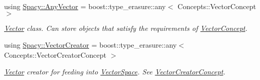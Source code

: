 \begin{DoxyCompactItemize}
using \hyperlink{group__SpacyGroup_gafc144d2730ef87a67e54f8cd750b1f54_gafc144d2730ef87a67e54f8cd750b1f54}{Spacy\+::\+Any\+Vector} = boost\+::type\+\_\+erasure\+::any$<$ Concepts\+::\+Vector\+Concept $>$
\begin{DoxyCompactList}\small\item\em \hyperlink{classSpacy_1_1Vector}{Vector} class. Can store objects that satisfy the requirements of \hyperlink{group__ConceptGroup_gad6958389d1fa2758a8a64a0a24c36004_VectorConceptAnchor}{Vector\+Concept}. \end{DoxyCompactList}\item 
using \hyperlink{group__SpacyGroup_ga1f5316487c031a478247206764bb2efb_ga1f5316487c031a478247206764bb2efb}{Spacy\+::\+Vector\+Creator} = boost\+::type\+\_\+erasure\+::any$<$ Concepts\+::\+Vector\+Creator\+Concept $>$
\begin{DoxyCompactList}\small\item\em \hyperlink{classSpacy_1_1Vector}{Vector} creator for feeding into \hyperlink{classSpacy_1_1VectorSpace}{Vector\+Space}. See \hyperlink{group__ConceptGroup_ga3064301642b7c66b1b08f88a12a04645_VectorCreatorConceptAnchor}{Vector\+Creator\+Concept}. \end{DoxyCompactList}\end{DoxyCompactItemize}
